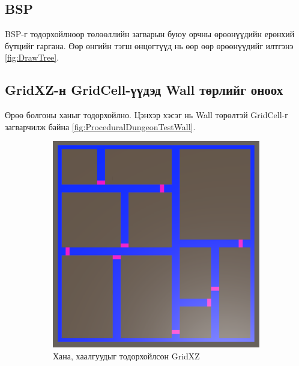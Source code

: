 \subsection{BSP}
BSP-г тодорхойлноор төлөөллийн загварын буюу орчны өрөөнүүдийн ерөнхий бүтцийг гаргана. Өөр өнгийн тэгш өнцөгтүүд нь өөр өөр өрөөнүүдийг илтгэнэ \ref{fig:DrawTree}.

\subsection{GridXZ-н GridCell-үүдэд Wall төрлийг оноох}
Өрөө болгоны ханыг тодорхойлно. Цэнхэр хэсэг нь Wall төрөлтэй GridCell-г загварчилж байна \ref{fig:ProceduralDungeonTestWall}.

\begin{figure}[ht]
	\centering
	\begin{subfigure}{\textwidth/2}
		\centering
		\includegraphics[width=\textwidth-1cm]{./images/ProceduralDungeonTestWallDoor.png}
		\caption{Хана, хаалгуудыг тодорхойлсон GridXZ}
		\label{fig:ProceduralDungeonTestWallDoor}
	\end{subfigure}%
	\begin{subfigure}{\textwidth/2}
		\centering

\end{subfigure}
\end{figure}
